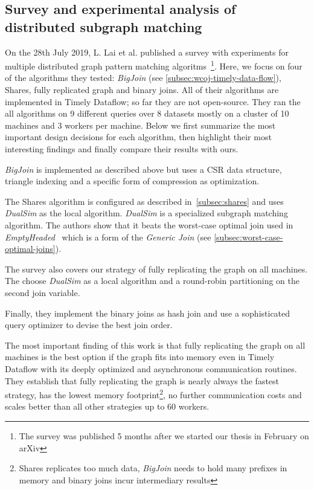 \subsection{Survey and experimental analysis of distributed subgraph matching}
On the 28th July 2019, L. Lai et al. published a survey with experiments for multiple
distributed graph pattern matching algoritms~\cite{longbin}\footnote{The survey was published 5 months after we started our thesis in
February
on
arXiv}.
Here, we focus on four of the algorithms they tested: \textit{BigJoin} (see \cref{subsec:wcoj-timely-data-flow}),
Shares, fully replicated graph and binary joins.
All of their algorithms are implemented in Timely Dataflow;
so far they are not open-source.
They ran the all algorithms on 9 different queries over 8 datasets mostly on a cluster of 10 machines
and 3 workers per machine.
Below we first summarize the most important design decisions for each algorithm, then
highlight their most interesting findings and finally compare their results with ours.

\textit{BigJoin} is implemented as described above but uses a \textsc{CSR} data structure,
triangle indexing and a specific form of compression as optimization.

The Shares algorithm is configured as described in~\cref{subsec:shares} and uses
\textit{DualSim} as the local algorithm.
\textit{DualSim} is a specialized subgraph matching algorithm.
The authors show that it beats the worst-case optimal join used in \textit{EmptyHeaded}~\cite{emptyheaded}
which is a form of the \textit{Generic Join} (see \cref{subsec:worst-case-optimal-joins}).

The survey also covers our strategy of fully replicating the graph on all machines.
The choose \textit{DualSim} as a local algorithm and a round-robin partitioning on the
second join variable.

Finally, they implement the binary joins as hash join and use a sophisticated query optimizer
to devise the best join order.

The most important finding of this work is that fully replicating the graph on all machines
is the best option if the graph fits into memory even in Timely Dataflow with its deeply
optimized and asynchronous communication routines.
They establish that fully replicating the graph is nearly always the fastest strategy,
has the lowest memory footprint\footnote{Shares replicates too much data,
\textit{BigJoin} needs to hold many prefixes in memory and binary joins incur intermediary results}, no
further
communication costs and scales better
than
all other strategies up to 60 workers.

